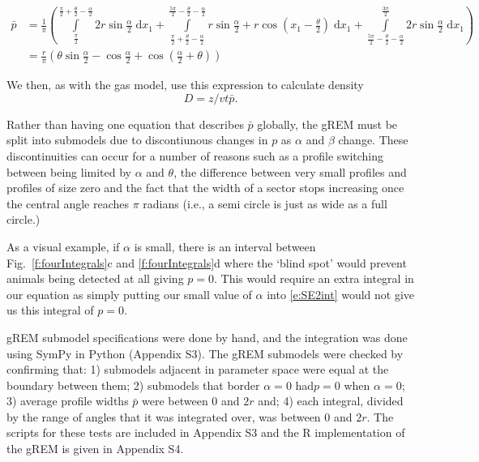 \documentclass[a4paper,10pt,reqno,oneside]{amsart}
\begin{document}
\begin{align}
    \bar{p} &=\frac{1}{\pi} \left(\int\limits_{\frac{\pi}{2}}^{\frac{\pi}{2} + \frac{\theta}{2} - \frac{\alpha}{2}}2 r \sin{\frac{\alpha}{2} }\;\mathrm{d}x_1+\int\limits_{\frac{\pi}{2} + \frac{\theta}{2} - \frac{\alpha}{2}}^{\frac{5 \pi}{2} - \frac{\theta}{2} - \frac{\alpha}{2}}r \sin{\frac{\alpha}{2} } + r \cos{\left (x_1 - \frac{\theta}{2} \right )}\;\mathrm{d}x_1+\int\limits_{\frac{5 \pi}{2} - \frac{\theta}{2} - \frac{\alpha}{2}}^{\frac{3 \pi}{2}}2 r \sin{\frac{\alpha}{2} }\;\mathrm{d}x_1\right) \label{e:SE2int}  \\
     &= \frac{r}{\pi} \left(\theta \sin{\frac{\alpha}{2} } - \cos{\frac{\alpha}{2} } + \cos{\left (\frac{\alpha}{2} + \theta \right )}\right) \label{e:SE2result}
\end{align}

We then, as with the gas model, use this expression to calculate density
\begin{equation}
\label{e:gas}
D = z/vt\bar{p}.
\end{equation}


Rather than having one equation that describes $\bar{p}$ globally, the gREM must be split into submodels due to discontiunous changes in $p$ as $\alpha$ and $\beta$ change. These discontinuities can occur for a number of reasons such as a profile switching between being limited by $\alpha$ and $\theta$, the difference between very small profiles and profiles of size zero and the fact that the width of a sector stops increasing once the central angle reaches $\pi$ radians (i.e., a semi circle is just as wide as a full circle.)

As a visual example, if $\alpha$ is small, there is an interval between Fig.~\ref{f:fourIntegrals}c and \ref{f:fourIntegrals}d where the `blind spot' would prevent animals being detected at all giving $p=0$. This would require an extra integral in our equation as simply putting our small value of $\alpha$ into \ref{e:SE2int} would not give us this integral of $p=0$.

gREM submodel specifications were done by hand, and the integration was done using SymPy \citep{sympy} in Python (Appendix S3). The gREM submodels were checked by confirming that: 1) submodels adjacent in parameter space were equal at the boundary between them; 2) submodels that border $ \alpha = 0$ had$p = 0$ when $ \alpha = 0$; 3) average profile widths $\bar{p}$ were between 0 and $2r$ and; 4) each integral, divided by the range of angles that it was integrated over, was between 0 and $2r$. The scripts for these tests are included in Appendix S3 and the R \citep{R} implementation of the gREM is given in Appendix S4.  
\end{document}
